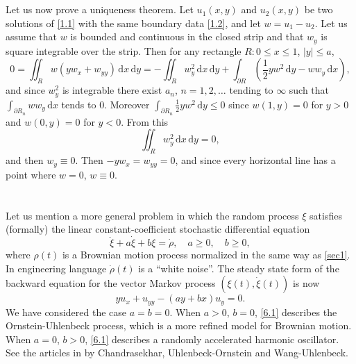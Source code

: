 \documentclass[leqno]{article}
\numberwithin{equation}{section}
\theoremstyle{plain}
\newcommand{\dd}{\,\mathrm{d}}
\begin{document}
\section{}
\label{sec5}

Let us now prove a uniqueness theorem.
Let $u_1(x,y)$ and $u_2(x,y)$ be two solutions of \eqref{1.1} with the same boundary data \eqref{1.2}, and let $w = u_1-u_2$.
Let us assume that $w$ is bounded and continuous in the closed strip and that $w_y$ is square integrable over the strip.
Then for any rectangle $R : 0 \leq x \leq 1$, $|y| \leq a$,
\begin{equation*}
	0 = \iint_R w (yw_x + w_{yy}) \dd x  \dd y
	= - \iint_R w_y^2 \dd x \dd y
	+ \int_{\partial R} \left( \frac 12 y w^2 \dd y - w w_y \dd x \right),
\end{equation*}
and since $w_y^2$ is integrable there exist $a_n$, $n = 1,2, \dotsc$ tending to $\infty$ such that $\int_{\partial R_n} w w_y \dd x$ tends to $0$.
Moreover $\int_{\partial R_n} \frac 12 y w^2 \dd y \leq 0$ since $w(1,y) = 0$ for $y > 0$ and $w(0,y) = 0$ for $y < 0$.
From this
\begin{equation*}
	\iint_R w_y^2 \dd x \dd y = 0,
\end{equation*}
and then $w_y \equiv 0$.
Then $-y w_x = w_{yy} = 0$, and since every horizontal line has a point where $w = 0$, $w \equiv 0$.

\section{}
\label{sec6}

Let us mention a more general problem in which the random process $\xi$ satisfies (formally) the linear constant-coefficient stochastic differential equation
\begin{equation}
	\label{6.1}
	\ddot{\xi} + a \dot{\xi} + b \xi = \dot{\rho},
	\quad 
	a \geq 0, \quad b \geq 0,
\end{equation}
where $\rho(t)$ is a Brownian motion process normalized in the same way as \cref{sec1}.
In engineering language $\dot{\rho}(t)$ is a ``white noise''.
The steady state form of the backward equation for the vector Markov process $(\xi(t), \dot{\xi}(t))$ is now
\begin{equation}
	\label{6.2}
	y u_x + u_{yy} - (ay+bx) u_y = 0.
\end{equation}
We have considered the case $a=b=0$.
When $a > 0$, $b = 0$, \eqref{6.1} describes the Ornstein-Uhlenbeck process, which is a more refined model for Brownian motion.
When $a = 0$, $b > 0$, \eqref{6.1} describes a randomly accelerated harmonic oscillator.
See the articles in \cite{W} by Chandrasekhar, Uhlenbeck-Ornstein and Wang-Uhlenbeck.
\end{document}
